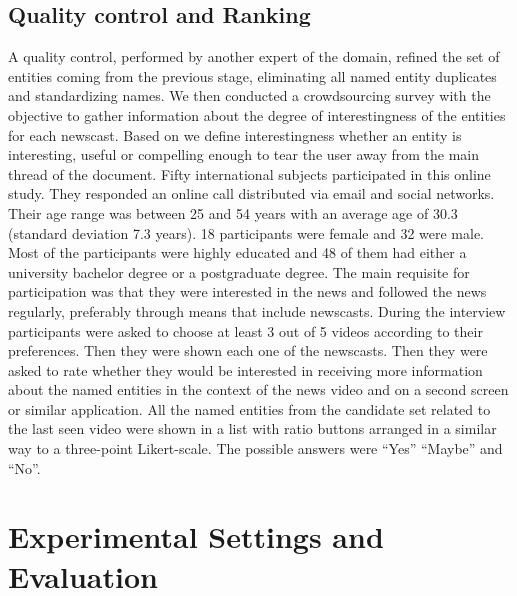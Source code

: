 \documentclass{llncs}
\newcommand{\todo}[1]{\colorbox{red}{#1}}
\begin{document}
\subsection{Quality control and Ranking}
A quality control, performed by another expert of the domain, refined the set of entities coming from the previous stage, eliminating all named entity duplicates and standardizing names. 
We then conducted a crowdsourcing survey with the objective to gather information about the degree of interestingness of the entities for each newscast. Based on \cite{vonBrzeski:2007:LCU:1321440.1321537} we define interestingness whether an entity is interesting, useful or compelling enough to tear the user away from the main thread of the document. Fifty international subjects participated in this online study. They responded an online call distributed via email and social networks. Their age range was between 25 and 54 years with an average age of 30.3 (standard deviation 7.3 years). 18 participants were female and 32 were male. Most of the participants were highly educated and 48 of them had either a university bachelor degree or a postgraduate degree. The main requisite for participation was that they were interested in the news and followed the news regularly, preferably through means that include newscasts.
During the interview participants were asked to choose at least 3 out of 5 videos according to their preferences. Then they were shown each one of the newscasts. Then they were asked to rate whether they would be interested in receiving more information about the named entities in the context of the news video and on a second screen or similar application. All the named entities from the candidate set related to the last seen video were shown in a list with ratio buttons arranged in a similar way to a three-point Likert-scale. The possible answers were ``Yes'' ``Maybe'' and ``No''. 


\section{Experimental Settings and Evaluation}
\label{sec:Evaluation}
\end{document}

